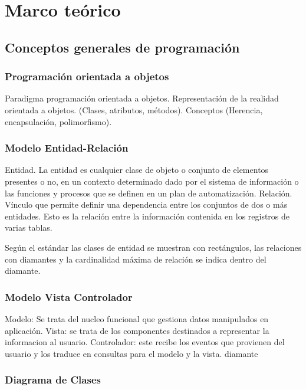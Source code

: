 \chapter{Marco teórico}

\section{Conceptos generales de programación}

\subsection{Programación orientada a objetos}

Paradigma programación orientada a objetos.
Representación de la realidad orientada a objetos. (Clases, atributos, métodos).
Conceptos (Herencia, encapsulación, polimorfismo).

\subsection{Modelo Entidad-Relación}

Entidad. La entidad es cualquier clase de objeto o conjunto de elementos presentes o no, en un contexto determinado dado por el sistema de información o las funciones y procesos que se definen en un plan de automatización.
Relación. Vínculo que permite definir una dependencia entre los conjuntos de dos o más entidades. Esto es la relación entre la información contenida en los registros de varias tablas.

Según el estándar las clases de entidad se muestran con rectángulos, las relaciones con diamantes  y la cardinalidad máxima de relación se indica dentro del diamante.

\subsection{Modelo Vista Controlador}

Modelo: Se trata del nucleo funcional que gestiona datos manipulados en aplicación.
Vista: se trata de los componentes destinados a representar la informacion al usuario.
Controlador: este recibe los eventos que provienen del usuario y los traduce en consultas para el modelo y la vista. diamante

\subsection{Diagrama de Clases}

